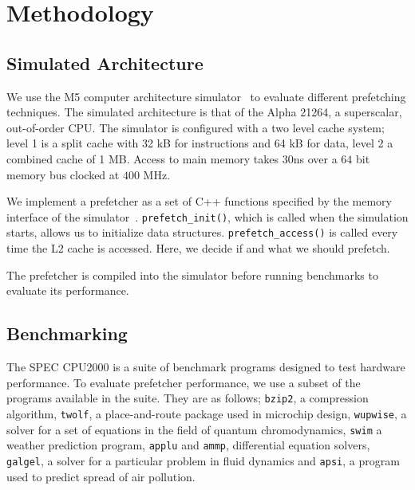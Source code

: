 \section{Methodology}
\label{sec:methodology}

\subsection{Simulated Architecture}

We use the M5 computer architecture simulator~\cite{bib:m5} to evaluate different prefetching techniques.
The simulated architecture is that of the Alpha 21264\cite{bib:alpha-21264}, a superscalar, out-of-order CPU.
The simulator is configured with a two level cache system; level 1 is a split cache with 32 kB for instructions and 64 kB for data, level 2 a combined cache of 1 MB.
Access to main memory takes $30$ns over a $64$ bit memory bus clocked at $400$ MHz.

We implement a prefetcher as a set of C++ functions specified by the memory interface of the simulator~\cite[Section 3.2]{bib:doc}.
\texttt{prefetch\_init()}, which is called when the simulation starts, allows us to initialize data structures.
\texttt{prefetch\_access()} is called every time the L2 cache is accessed.
Here, we decide if and what we should prefetch.

The prefetcher is compiled into the simulator before running benchmarks to evaluate its performance.

\subsection{Benchmarking}

The SPEC CPU2000\cite{bib:cpu2000} is a suite of benchmark programs designed to test hardware performance.
To evaluate prefetcher performance, we use a subset of the programs available in the suite.
They are as follows; \texttt{bzip2}, a compression algorithm, \texttt{twolf},
a place-and-route package used in microchip design, \texttt{wupwise}, a solver for a set of
equations in the field of quantum chromodynamics, \texttt{swim} a weather prediction program,
\texttt{applu} and \texttt{ammp}, differential equation solvers, \texttt{galgel}, a solver for a
particular problem in fluid dynamics and \texttt{apsi}, a program used to predict spread of air pollution.

